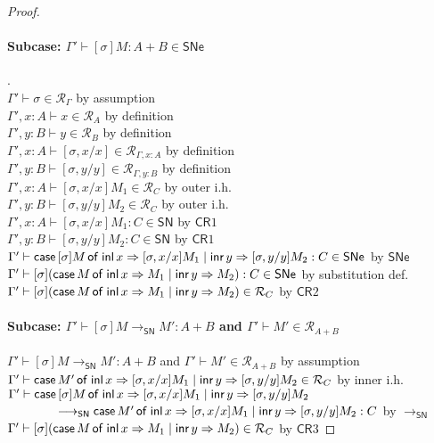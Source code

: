 \documentclass{article}
\newcommand{\SN}{\mathsf{SN}}
\newcommand{\SNe}{\mathsf{SNe}}
\newcommand{\CR}{\textsf{CR}}
\newcommand{\denot}[1]{\mathcal{R}_{#1}}
\newcommand{\inden}[3]{#1 \vdash #2 \in \denot{#3}}
\newcommand{\redSN}{\longrightarrow_\SN}
\begin{document}
\begin{proof}
\paragraph{Subcase: $\Gamma' \vdash [\sigma]M : A + B \in \SNe$}.$\;$\\
$\inden{\Gamma'}{\sigma}{\Gamma}$ \hfill by assumption \\
$\inden{\Gamma', x{:}A}{x}{A}$ \hfill by definition \\
$\inden{\Gamma', y{:}B}{y}{B}$  \hfill by definition \\
$\inden{\Gamma', x{:}A}{[\sigma, x/x]}{\Gamma, x:A}$ \hfill by definition \\
$\inden{\Gamma', y{:}B}{[\sigma, y/y]}{\Gamma, y:B}$ \hfill by definition \\
$\inden{\Gamma', x{:}A}{[\sigma, x/x]M_1}{C}$ \hfill by outer i.h. \\
$\inden{\Gamma', y{:}B}{[\sigma, y/y]M_2}{C}$ \hfill by outer i.h. \\
$\Gamma', x{:}A \vdash [\sigma, x/x]M_1 : C \in \SN$ \hfill by $\CR1$ \\
$\Gamma', y{:}B \vdash [\sigma, y/y]M_2 : C \in \SN$ \hfill by $\CR1$ \\
$\Gamma' \vdash \caseof{[\sigma]M}{[\sigma, x/x]M_1}{[\sigma, y/y]M_2} : C \in \SNe$ \hfill by $\SNe$ \\
$\Gamma' \vdash [\sigma](\caseof{M}{M_1}{M_2}) : C \in \SNe$ \hfill by substitution def. \\
$\inden{\Gamma'}{[\sigma](\caseof{M}{M_1}{M_2})}{C}$ \hfill by $\CR2$


\paragraph{Subcase: $\Gamma' \vdash [\sigma]M \redSN M' : A + B$ and $\inden{\Gamma'}{M'}{A+B}$}$\;$\\
$\Gamma' \vdash [\sigma]M \redSN M' : A + B$ and $\inden{\Gamma'}{M'}{A+B}$ \hfill by assumption \\
$\inden{\Gamma'}{\caseof{M'}{[\sigma,x/x]M_1}{[\sigma,y/y]M_2}}{C}$ \hfill by inner i.h. \\
$\Gamma' \vdash \textsf{case}\,[\sigma]M\,\textsf{of inl}\,x \Rightarrow [\sigma,x/x]M_1 \mid \textsf{inr}\,y \Rightarrow [\sigma,y/y]M_2 $ \\
$\qquad \qquad\redSN
\caseof{M'}{[\sigma,x/x]M_1}{[\sigma,y/y]M_2} : C$ \hfill by $\redSN$\\
$\inden{\Gamma'}{[\sigma](\caseof{M}{M_1}{M_2})}{C}$ \hfill by $\CR3$

\end{proof}
\end{document}

